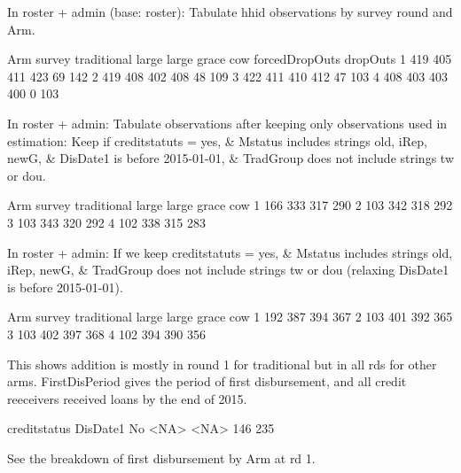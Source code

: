 In \textsf{roster + admin} (base: roster): Tabulate \textsf{hhid} observations by \textsf{survey} round and \textsf{Arm}.
\begin{Schunk}
\begin{Soutput}
      Arm
survey traditional large large grace cow forcedDropOuts dropOuts
     1         419   405         411 423             69      142
     2         419   408         402 408             48      109
     3         422   411         410 412             47      103
     4         408   403         403 400              0      103
\end{Soutput}
\end{Schunk}
In \textsf{roster + admin}: Tabulate observations after keeping only observations used in estimation: Keep if \textsf{creditstatuts} = yes, \& \textsf{Mstatus} includes strings old, iRep, newG, \& \textsf{DisDate1} is before 2015-01-01, \& \textsf{TradGroup} does not include strings tw or dou.
\begin{Schunk}
\begin{Soutput}
      Arm
survey traditional large large grace cow
     1         166   333         317 290
     2         103   342         318 292
     3         103   343         320 292
     4         102   338         315 283
\end{Soutput}
\end{Schunk}
In \textsf{roster + admin}: If we keep \textsf{creditstatuts} = yes, \& \textsf{Mstatus} includes strings old, iRep, newG, \& \textsf{TradGroup} does not include strings tw or dou (relaxing  \textsf{DisDate1} is before 2015-01-01). \gobblepars
\begin{Schunk}
\begin{Soutput}
      Arm
survey traditional large large grace cow
     1         192   387         394 367
     2         103   401         392 365
     3         103   402         397 368
     4         102   394         390 356
\end{Soutput}
\end{Schunk}
This shows addition is mostly in round 1 for \textsf{traditional} but in all rds for other arms. \textsf{FirstDisPeriod} gives the period of first disbursement, and all credit reeceivers received loans by the end of 2015.
\begin{Schunk}
\begin{Soutput}
        creditstatus
DisDate1  No <NA>
    <NA> 146  235
\end{Soutput}
\end{Schunk}
See the breakdown of first disbursement by Arm at rd 1.
